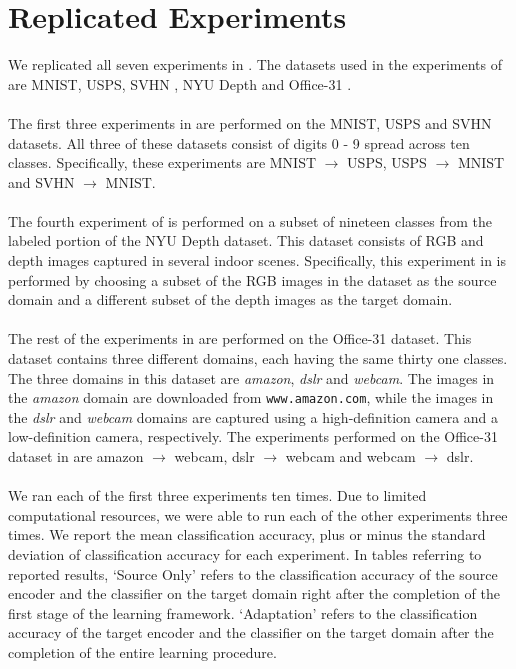 \documentclass[14pt]{extarticle}
\begin{document}
		\section{Replicated Experiments}
		We replicated all seven experiments in \cite{adda}. The datasets used in the experiments of \cite{adda} are MNIST, USPS, SVHN \cite{svhn}, NYU Depth \cite{nyud2} and Office-31 \cite{office31}.\\\\
		The first three experiments in \cite{adda} are performed on the MNIST, USPS and SVHN datasets. All three of these datasets consist of digits 0 - 9 spread across ten classes. Specifically, these experiments are MNIST $\rightarrow$ USPS, USPS $\rightarrow$ MNIST and SVHN $\rightarrow$ MNIST.\\\\
		The fourth experiment of \cite{adda} is performed on a subset of nineteen classes from the labeled portion of the NYU Depth dataset. This dataset consists of RGB and depth images captured in several indoor scenes. Specifically, this experiment in \cite{adda} is performed by choosing a subset of the RGB images in the dataset as the source domain and a different subset of the depth images as the target domain.\\\\
		The rest of the experiments in \cite{adda} are performed on the Office-31 dataset. This dataset contains three different domains, each having the same thirty one classes. The three domains in this dataset are \textit{amazon}, \textit{dslr} and \textit{webcam}. The images in the \textit{amazon} domain are downloaded from \texttt{www.amazon.com}, while the images in the \textit{dslr} and \textit{webcam} domains are captured using a high-definition camera and a low-definition camera, respectively. The experiments performed on the Office-31 dataset in \cite{adda} are amazon $\rightarrow$ webcam, dslr $\rightarrow$ webcam and webcam $\rightarrow$ dslr.\\\\
		We ran each of the first three experiments ten times. Due to limited computational resources, we were able to run each of the other experiments three times. We report the mean classification accuracy, plus or minus the standard deviation of classification accuracy for each experiment. In tables referring to reported results, `Source Only' refers to the classification accuracy of the source encoder and the classifier on the target domain right after the completion of the first stage of the learning framework. `Adaptation' refers to the classification accuracy of the target encoder and the classifier on the target domain after the completion of the entire learning procedure.
\end{document}
